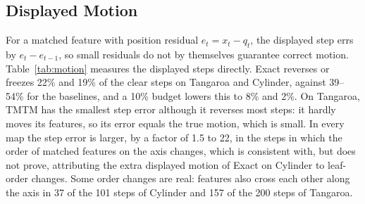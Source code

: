 \documentclass[preprint]{vgtc}
\begin{document}
\subsection{Displayed Motion}\label{sec:displayed-motion}

For a matched feature with position residual $e_t=x_t-q_t$, the displayed step errs by $e_t-e_{t-1}$, so small residuals do not by themselves guarantee correct motion. Table~\ref{tab:motion} measures the displayed steps directly. Exact reverses or freezes 22\% and 19\% of the clear steps on Tangaroa and Cylinder, against 39--54\% for the baselines, and a 10\% budget lowers this to 8\% and 2\%. On Tangaroa, TMTM has the smallest step error although it reverses most steps: it hardly moves its features, so its error equals the true motion, which is small. In every map the step error is larger, by a factor of 1.5 to 22, in the steps in which the order of matched features on the axis changes, which is consistent with, but does not prove, attributing the extra displayed motion of Exact on Cylinder to leaf-order changes. Some order changes are real: features also cross each other along the axis in 37 of the 101 steps of Cylinder and 157 of the 200 steps of Tangaroa.


\end{document}
